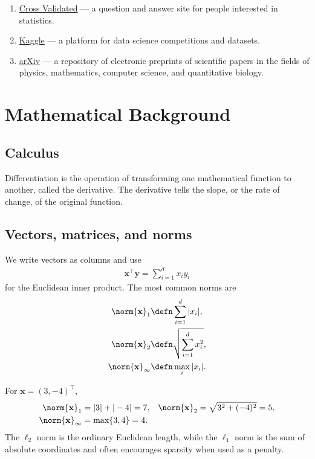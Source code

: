 \documentclass[a4paper, 12pt]{book}
\begin{document}
\begin{enumerate}
    \item \href{https://stats.stackexchange.com/}{Cross Validated} --- a question and answer site for people interested in statistics.
    \item \href{https://www.kaggle.com/}{Kaggle} --- a platform for data science competitions and datasets.
    \item \href{https://arxiv.org/}{arXiv} --- a repository of electronic preprints of scientific papers in the fields of physics, mathematics, computer science, and quantitative biology.
\end{enumerate}

\chapter{Mathematical Background}
\label{ch:calc}


\section{Calculus}

Differentiation is the operation of transforming one mathematical function to another, called the derivative. The derivative tells the slope, or the rate of change, of the original function.

\section{Vectors, matrices, and norms}

We write vectors as columns and use
\begin{align}
    \mathbf{x}^\top \mathbf{y} = \sum_{i=1}^d x_i y_i
\end{align}
for the Euclidean inner product. The most common norms are
\begin{align}
    \norm{\mathbf{x}}_1 &\defn \sum_{i=1}^d |x_i|, \\
    \norm{\mathbf{x}}_2 &\defn \sqrt{\sum_{i=1}^d x_i^2}, \\
    \norm{\mathbf{x}}_\infty &\defn \max_i |x_i|.
\end{align}
\begin{example}
    For $\mathbf{x} = (3,-4)^\top$,
    \begin{align}
        \norm{\mathbf{x}}_1 &= |3|+|-4| = 7, &
        \norm{\mathbf{x}}_2 &= \sqrt{3^2+(-4)^2} = 5, \\
        \norm{\mathbf{x}}_\infty &= \max\{3,4\} = 4.
    \end{align}
    The $\ell_2$ norm is the ordinary Euclidean length, while the $\ell_1$ norm is
    the sum of absolute coordinates and often encourages sparsity when used as a
    penalty.
\end{example}
\end{document}

